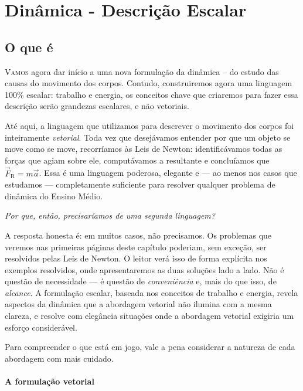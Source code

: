 
\chapter{Dinâmica - Descrição Escalar}

\section*{O que é}

\lettrine{V}{amos} agora dar início a uma nova formulação da dinâmica -- do estudo das causas do movimento dos corpos. Contudo, construiremos agora uma linguagem 100\% escalar: trabalho e energia, os conceitos chave que criaremos para fazer essa descrição serão grandezas escalares, e não vetoriais.

Até aqui, a linguagem que utilizamos para descrever o movimento dos corpos foi
inteiramente \textit{vetorial}. Toda vez que desejávamos entender por que um objeto
se move como se move, recorríamos às Leis de Newton: identificávamos todas as forças
que agiam sobre ele, computávamos a resultante e concluíamos que
$\vec{F}_{\text{R}} = m\vec{a}$. Essa é uma linguagem poderosa, elegante e --- ao
menos nos casos que estudamos --- completamente suficiente para resolver qualquer
problema de dinâmica do Ensino Médio.

\begin{center}
    \emph{Por que, então, precisaríamos de uma segunda linguagem?}
\end{center}
 

 
A resposta honesta é: em muitos casos, não precisamos. Os problemas que veremos nas
primeiras páginas deste capítulo poderiam, sem exceção, ser resolvidos pelas Leis de
Newton. O leitor verá isso de forma explícita nos exemplos resolvidos, onde
apresentaremos as duas soluções lado a lado. Não é questão de necessidade --- é
questão de \textit{conveniência} e, mais do que isso, de \textit{alcance}. A
formulação escalar, baseada nos conceitos de trabalho e energia, revela aspectos da
dinâmica que a abordagem vetorial não ilumina com a mesma clareza, e resolve com
elegância situações onde a abordagem vetorial exigiria um esforço considerável.
 
Para compreender o que está em jogo, vale a pena considerar a natureza de cada
abordagem com mais cuidado.
 
\subsubsection*{A formulação vetorial}
 
